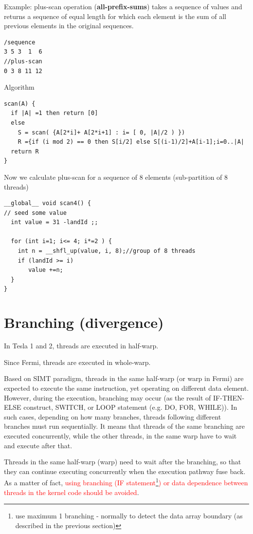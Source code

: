 Example: plus-scan operation ({\bf all-prefix-sums}) takes a sequence of values
and returns a sequence of equal length for which each element is the sum of all
previous elements in the original sequences. 
\begin{verbatim}
/sequence
3 5 3  1  6
//plus-scan 
0 3 8 11 12
\end{verbatim}
Algorithm
\begin{verbatim}
scan(A) {
  if |A| =1 then return [0]
  else
    S = scan( {A[2*i]+ A[2*i+1] : i= [ 0, |A|/2 ) }) 
    R ={if (i mod 2) == 0 then S[i/2] else S[(i-1)/2]+A[i-1];i=0..|A|
  return R
}
\end{verbatim}
Now we calculate plus-scan for a sequence of 8 elements (sub-partition of 8
threads)
\begin{verbatim}
__global__ void scan4() {
// seed some value
  int value = 31 -landId ;;

  for (int i=1; i<= 4; i*=2 ) {
    int n = __shfl_up(value, i, 8);//group of 8 threads
    if (landId >= i)
       value +=n;
  }
}
\end{verbatim}





\section{Branching (divergence)}
\label{sec:branching-divergence}

\begin{framed}
  In Tesla 1 and 2, threads are executed in half-warp.

  Since Fermi, threads are executed in whole-warp.
\end{framed}

Based on SIMT paradigm, threads in the same half-warp (or warp in
Fermi) are expected to execute the same instruction, yet operating on
different data element. However, during the execution, branching may
occur (as the result of IF-THEN-ELSE construct, SWITCH, or LOOP
statement (e.g. DO, FOR, WHILE)). In such cases, depending on how many
branches, threads following different branches must run
sequentially. It means that threads of the same branching are executed
concurrently, while the other threads, in the same warp have to wait
and execute after that.

Threads in the same half-warp (warp) need to wait after the branching,
so that they can continue executing concurrently when the execution
pathway fuse back. As a matter of fact,
\textcolor{red}{using branching (IF
  statement\footnote{use maximum 1 branching - normally to detect the
    data array boundary (as described in the previous section)})
  or data dependence between threads in the kernel code should be
  avoided}.

